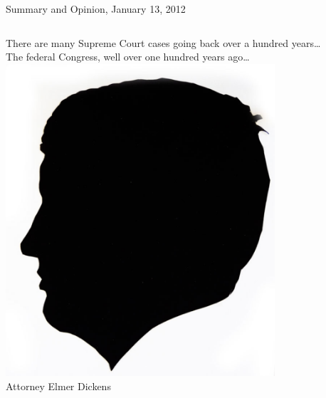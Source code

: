 \begin{frame}{Summary and Opinion, January 13, 2012}
    \begin{columns}[onlytextwidth]
        There are many Supreme Court cases going back over a hundred years\ldots \\
        \vspace{16pt}
        The federal Congress, well over one hundred years ago\ldots
            \centering
            \includegraphics[width=0.75\textwidth]{img/elmer-dickens.png}
            \\ Attorney Elmer Dickens \\
    \end{columns}
\end{frame}

